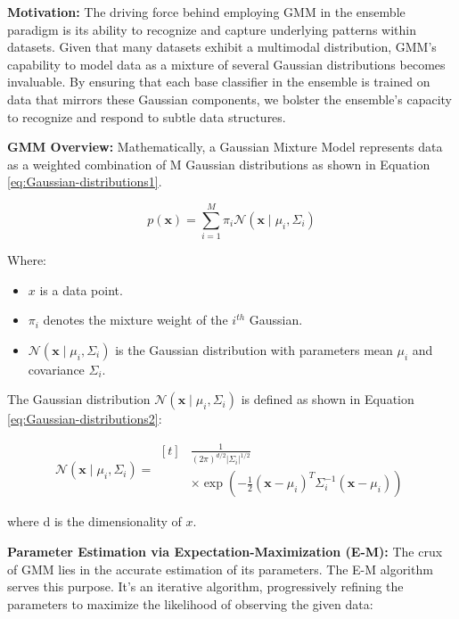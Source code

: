 \documentclass[lettersize,journal]{IEEEtran}
\begin{document}
	\textbf{Motivation:} The driving force behind employing GMM in the ensemble paradigm is its ability to recognize and capture underlying patterns
	within datasets. Given that many datasets exhibit a multimodal distribution,
	GMM’s capability to model data as a mixture of several Gaussian distributions becomes invaluable. By ensuring that each base classifier in the ensemble is trained on data that mirrors these Gaussian components, we bolster
	the ensemble’s capacity to recognize and respond to subtle data structures.
	
	\textbf{GMM Overview:}
	Mathematically, a Gaussian Mixture Model represents data as a weighted combination of M Gaussian distributions as shown in Equation \ref{eq:Gaussian-distributions1}.
	
	\begin{equation}
		\label{eq:Gaussian-distributions1}
		p(\mathbf{x})=\sum_{i=1}^M \pi_i \mathcal{N}\left(\mathbf{x} \mid \mu_i, \Sigma_i\right)
	\end{equation}
	
	Where:
	\begin{itemize}
		\item $x$ is a data point.
		\item $\pi_i$ denotes the mixture weight of the $i^{{th }}$ Gaussian.
		\item $\mathcal{N}\left(\mathbf{x} \mid \mu_i, \Sigma_i\right)$ is the Gaussian distribution with parameters mean $\mu_i$ and covariance ${\Sigma}_i$.
	\end{itemize}
	
	The Gaussian distribution $\mathcal{N}\left(\mathbf{x} \mid \mu_i, {\Sigma}_i\right)$ is defined as shown in Equation \ref{eq:Gaussian-distributions2}:
	
	\begin{equation}
		\label{eq:Gaussian-distributions2}
		\mathcal{N}\left(\mathbf{x} \mid \mu_i, {\Sigma}_i\right) = 
		\begin{aligned}[t]
			&\frac{1}{(2 \pi)^{d / 2}\left|{\Sigma}_i\right|^{1 / 2}} \\
			&\times \exp \left(-\frac{1}{2}\left(\mathbf{x}-\mu_i\right)^T {\Sigma}_i^{-1}\left(\mathbf{x}-\mu_i\right)\right)
		\end{aligned}
	\end{equation}
	
	
	where d is the dimensionality of $x$.
	
	\textbf{Parameter Estimation via Expectation-Maximization (E-M):}
	The crux of GMM lies in the accurate estimation of its parameters. The E-M algorithm serves this purpose. It’s an iterative algorithm, progressively refining
	the parameters to maximize the likelihood of observing the given data:
	
\end{document}
